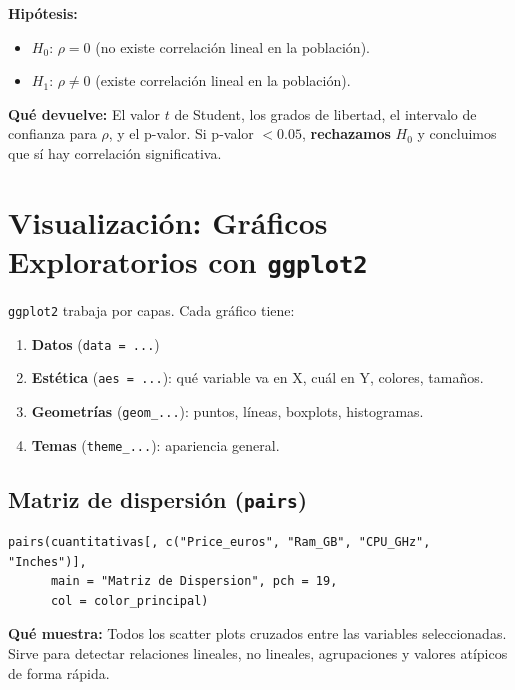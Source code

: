 \documentclass[12pt,a4paper]{article}
\begin{document}
\textbf{Hipótesis:}
\begin{itemize}
    \item $H_0$: $\rho = 0$ (no existe correlación lineal en la población).
    \item $H_1$: $\rho \neq 0$ (existe correlación lineal en la población).
\end{itemize}

\textbf{Qué devuelve:} El valor $t$ de Student, los grados de libertad, el intervalo de confianza para $\rho$, y el p-valor. Si p-valor $< 0.05$, \textbf{rechazamos} $H_0$ y concluimos que sí hay correlación significativa.

\section{Visualización: Gráficos Exploratorios con \texttt{ggplot2}}

\texttt{ggplot2} trabaja por capas. Cada gráfico tiene:
\begin{enumerate}
    \item \textbf{Datos} (\texttt{data = ...})
    \item \textbf{Estética} (\texttt{aes = ...}): qué variable va en X, cuál en Y, colores, tamaños.
    \item \textbf{Geometrías} (\texttt{geom\_...}): puntos, líneas, boxplots, histogramas.
    \item \textbf{Temas} (\texttt{theme\_...}): apariencia general.
\end{enumerate}

\subsection{Matriz de dispersión (\texttt{pairs})}

\begin{lstlisting}
pairs(cuantitativas[, c("Price_euros", "Ram_GB", "CPU_GHz", "Inches")],
      main = "Matriz de Dispersion", pch = 19, 
      col = color_principal)
\end{lstlisting}

\textbf{Qué muestra:} Todos los scatter plots cruzados entre las variables seleccionadas. Sirve para detectar relaciones lineales, no lineales, agrupaciones y valores atípicos de forma rápida.
\end{document}
